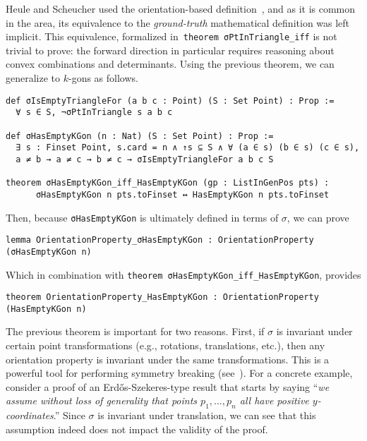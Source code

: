 



Heule and Scheucher used the orientation-based definition~\cite{emptyHexagonNumber}, and as it is common in the area, its equivalence to the \emph{ground-truth} mathematical definition was left implicit.
This equivalence, formalized in~\lstinline|theorem σPtInTriangle_iff| is not trivial to prove:
the forward direction in particular requires reasoning about convex combinations and determinants.
Using the previous theorem, we can generalize to $k$-gons as follows.
\begin{lstlisting}
def σIsEmptyTriangleFor (a b c : Point) (S : Set Point) : Prop :=
  ∀ s ∈ S, ¬σPtInTriangle s a b c

def σHasEmptyKGon (n : Nat) (S : Set Point) : Prop :=
  ∃ s : Finset Point, s.card = n ∧ ↑s ⊆ S ∧ ∀ (a ∈ s) (b ∈ s) (c ∈ s), 
  a ≠ b → a ≠ c → b ≠ c → σIsEmptyTriangleFor a b c S

theorem σHasEmptyKGon_iff_HasEmptyKGon (gp : ListInGenPos pts) :
      σHasEmptyKGon n pts.toFinset ↔ HasEmptyKGon n pts.toFinset
\end{lstlisting}

Then, because \lstinline|σHasEmptyKGon| is ultimately defined in terms of $\sigma$, we can prove
\begin{lstlisting}
lemma OrientationProperty_σHasEmptyKGon : OrientationProperty (σHasEmptyKGon n)
\end{lstlisting}
Which in combination with \lstinline|theorem σHasEmptyKGon_iff_HasEmptyKGon|, provides
\begin{lstlisting}
theorem OrientationProperty_HasEmptyKGon : OrientationProperty (HasEmptyKGon n)
\end{lstlisting}

The previous theorem is important for two reasons.
First, if $\sigma$ is invariant under certain point transformations (e.g., rotations, translations, etc.),
then any orientation property is invariant under the same transformations.
This is a powerful tool for performing symmetry breaking (see~).
For a concrete example, consider a proof of an Erd\H{o}s-Szekeres-type result that starts by saying ``\emph{we assume without loss of generality that points $p_1, \ldots, p_n$ all have positive $y$-coordinates}.''
Since $\sigma$ is invariant under translation, we can see that this assumption indeed does not impact the validity of the proof.

